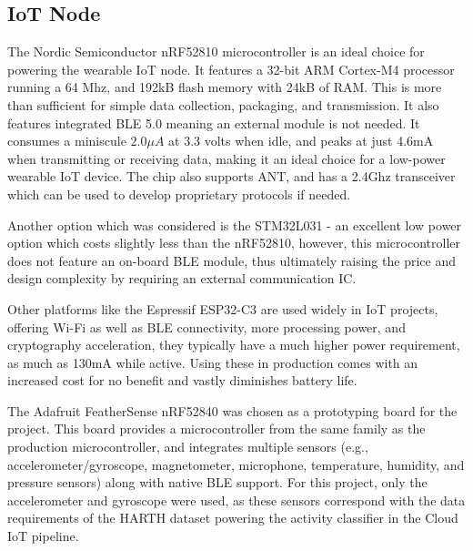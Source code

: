 \documentclass[conference]{IEEEtran}
\begin{document}
\subsection{IoT Node}
The Nordic Semiconductor nRF52810 microcontroller\cite{nRF52810} is an ideal choice for powering the wearable IoT node. It features a 32-bit ARM Cortex-M4 processor running a 64 Mhz, and 192kB flash memory with 24kB of RAM. This is more than sufficient for simple data collection, packaging, and transmission. It also features integrated BLE 5.0 meaning an external module is not needed. It consumes a miniscule $2.0\mu A$ at 3.3 volts when idle, and peaks at just 4.6mA when transmitting or receiving data, making it an ideal choice for a low-power wearable IoT device. The chip also supports ANT, and has a 2.4Ghz transceiver which can be used to develop proprietary protocols if needed.

Another option which was considered is the STM32L031 - an excellent low power option which costs slightly less than the nRF52810, however, this microcontroller does not feature an on-board BLE module, thus ultimately raising the price and design complexity by requiring an external communication IC. 

Other platforms like the Espressif ESP32-C3 are used widely in IoT projects, offering Wi-Fi as well as BLE connectivity, more processing power, and cryptography acceleration\cite{b8}, they typically have a much higher power requirement, as much as 130mA while active. Using these in production comes with an increased cost for no benefit and vastly diminishes battery life.

The Adafruit FeatherSense nRF52840\cite{b7} was chosen as a prototyping board for the project. This board provides a microcontroller from the same family as the production microcontroller, and integrates multiple sensors (e.g., accelerometer/gyroscope, magnetometer, microphone, temperature, humidity, and pressure sensors) along with native BLE support. For this project, only the accelerometer and gyroscope were used, as these sensors correspond with the data requirements of the HARTH dataset \cite{b5,b6} powering the activity classifier in the Cloud IoT pipeline.
\end{document}
